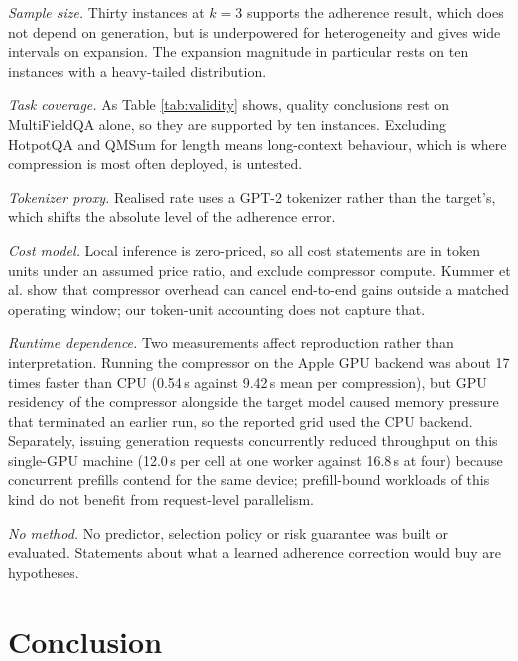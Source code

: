 \documentclass[conference]{IEEEtran}
\begin{document}
\textit{Sample size.} Thirty instances at $k=3$ supports the adherence result,
which does not depend on generation, but is underpowered for heterogeneity and
gives wide intervals on expansion. The expansion magnitude in particular rests
on ten instances with a heavy-tailed distribution.

\textit{Task coverage.} As Table \ref{tab:validity} shows, quality
conclusions rest on MultiFieldQA alone, so they are supported by ten
instances. Excluding HotpotQA and QMSum for length means long-context
behaviour, which is where compression is most often deployed, is untested.

\textit{Tokenizer proxy.} Realised rate uses a GPT-2 tokenizer rather than the
target's, which shifts the absolute level of the adherence error.

\textit{Cost model.} Local inference is zero-priced, so all cost statements
are in token units under an assumed price ratio, and exclude compressor
compute. Kummer et al. \cite{kummer2026wild} show that compressor overhead can
cancel end-to-end gains outside a matched operating window; our token-unit
accounting does not capture that.

\textit{Runtime dependence.} Two measurements affect reproduction rather than
interpretation. Running the compressor on the Apple GPU backend was about
17 times faster than CPU (0.54\,s against 9.42\,s mean per compression), but
GPU residency of the compressor alongside the target model caused memory
pressure that terminated an earlier run, so the reported grid used the CPU
backend. Separately, issuing generation requests concurrently reduced
throughput on this single-GPU machine (12.0\,s per cell at one worker against
16.8\,s at four) because concurrent prefills contend for the same device;
prefill-bound workloads of this kind do not benefit from request-level
parallelism.

\textit{No method.} No predictor, selection policy or risk guarantee was
built or evaluated. Statements about what a learned adherence correction would
buy are hypotheses.

\section{Conclusion}
\end{document}
